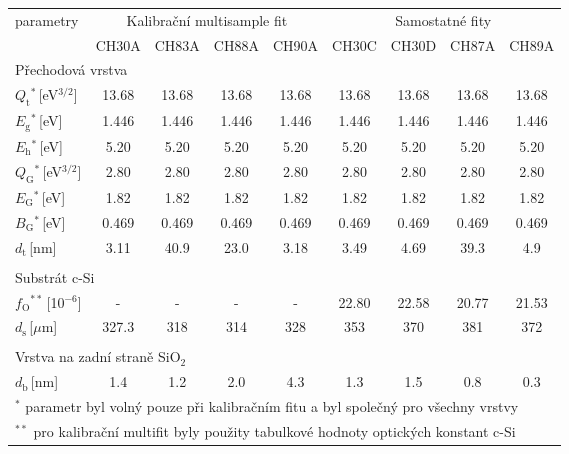 \begin{tabular}{lcccccccc}
\hline
parametry & \multicolumn{4}{c}{Kalibrační multisample fit} & \multicolumn{4}{c}{Samostatné fity}\\
 & CH30A & CH83A & CH88A & CH90A & CH30C & CH30D & CH87A & CH89A\\
\hline
\multicolumn{9}{l}{Přechodová vrstva}\\
\hline
$Q_\mathrm{t}$$^\ast$\,[eV$^{3/2}$] & 13.68 & 13.68 & 13.68 & 13.68 & 13.68 & 13.68 & 13.68 & 13.68\\
$E_\mathrm{g}$$^\ast$\,[eV] & 1.446 & 1.446 & 1.446 & 1.446 & 1.446 & 1.446 & 1.446 & 1.446\\
$E_\mathrm{h}$$^\ast$\,[eV] & 5.20 & 5.20 & 5.20 & 5.20 & 5.20 & 5.20 & 5.20 & 5.20 \\
$Q_\mathrm{G}$$^\ast$\,[eV$^{3/2}$] & 2.80 & 2.80 & 2.80 & 2.80 & 2.80 & 2.80 & 2.80 & 2.80\\
$E_\mathrm{G}$$^\ast$\,[eV] & 1.82 & 1.82 & 1.82 & 1.82 & 1.82 & 1.82 & 1.82 & 1.82\\
$B_\mathrm{G}$$^\ast$\,[eV] & 0.469 & 0.469 & 0.469 & 0.469 & 0.469 & 0.469 & 0.469 & 0.469\\
$d_\mathrm{t}$\,[nm] & 3.11 & 40.9 & 23.0 & 3.18 & 3.49 & 4.69 & 39.3 & 4.9\\
\multicolumn{9}{l}{}\\
\multicolumn{9}{l}{Substrát c-Si}\\
\hline
$f_\mathrm{O}$$^{\ast\ast}$\,[10$^{-6}$] & - & - & - & - & 22.80 & 22.58 & 20.77 & 21.53\\
$d_\mathrm{s}$\,[$\mu$m] & 327.3 & 318 & 314 & 328 & 353 & 370 & 381 & 372\\
\multicolumn{9}{l}{}\\
\multicolumn{9}{l}{Vrstva na zadní straně SiO$_2$}\\
\hline
$d_\mathrm{b}$\,[nm] & 1.4 & 1.2 & 2.0 & 4.3 & 1.3 & 1.5 & 0.8 & 0.3\\

\hline
\multicolumn{9}{l}{$^\ast$ parametr byl volný pouze při kalibračním fitu a byl společný pro všechny vrstvy}\\
\multicolumn{9}{l}{$^{\ast\ast}$ pro kalibrační multifit byly použity tabulkové hodnoty optických konstant c-Si}\\
\end{tabular}
